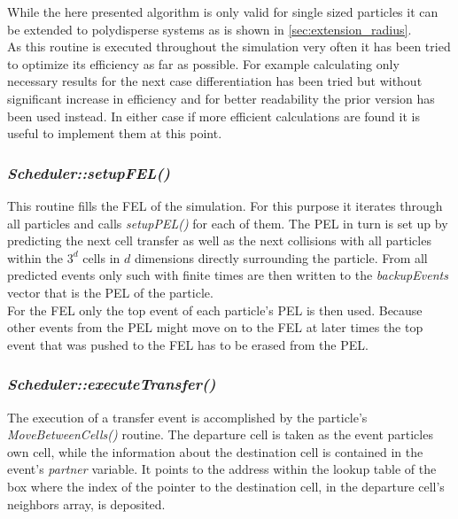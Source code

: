 While the here presented algorithm is only valid for single sized particles it can be extended to polydisperse systems as is shown in \autoref{sec:extension_radius}.\\

As this routine is executed throughout the simulation very often it has been tried to optimize its efficiency as far as possible. For example calculating only necessary results for the next case differentiation has been tried but without significant increase in efficiency and for better readability the prior version has been used instead. In either case if more efficient calculations are found it is useful to implement them at this point.\\   

\subsubsection{\quad \textit{Scheduler::setupFEL()}}
This routine fills the FEL of the simulation. For this purpose it iterates through all particles and calls \textit{setupPEL()} for each of them. The PEL in turn is set up by predicting the next cell transfer as well as the next collisions with all particles within the $3^d$ cells in $d$ dimensions directly surrounding the particle. From all predicted events only such with finite times are then written to the \textit{backupEvents} vector that is the PEL of the particle.\\
For the FEL only the top event of each particle's PEL is then used. Because other events from the PEL might move on to the FEL at later times the top event that was pushed to the FEL has to be erased from the PEL.\\

\subsubsection{\quad \textit{Scheduler::executeTransfer()}}
The execution of a transfer event is accomplished by the particle's \textit{MoveBetweenCells()} routine. The departure cell is taken as the event particles own cell, while the information about the destination cell is contained in the event's \textit{partner} variable. It points to the address within the lookup table of the box where the index of the pointer to the destination cell, in the departure cell's neighbors array, is deposited.\\

